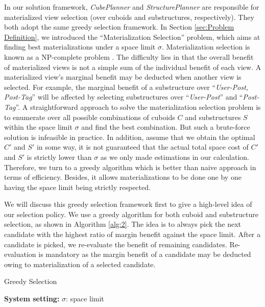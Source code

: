 	In our solution framework, \emph{CubePlanner} and \emph{StructurePlanner} are responsible for materialized view selection (over cuboids and substructures, respectively). They both adopt the same greedy selection framework. In Section \ref{sec:Problem Definition}, we introduced the ``Materialization Selection'' problem, which aims at finding best materializations under a space limit $\sigma$. Materialization selection is known as a NP-complete problem \cite{DBLP:journals/kais/LinK04}. The difficulty lies in that the overall benefit of materialized views is not a simple sum of the individual benefit of each view. A materialized view's marginal benefit may be deducted when another view is selected. For example, the marginal benefit of a substructure over ``\textit{User-Post, Post-Tag}'' will be affected by selecting substructures over ``\textit{User-Post}'' and ``\textit{Post-Tag}''. A straightforward approach to solve the materialization selection problem is to enumerate over all possible combinations of cuboids $C$ and substructures $S$ within the space limit $\sigma$ and find the best combination. But such a brute-force solution is infeasible in practice. In addition, assume that we obtain the optimal $C'$ and $S'$ in some way, it is not guaranteed that the actual total space cost of $C'$ and $S'$ is strictly lower than $\sigma$ as we only made estimations in our calculation. Therefore, we turn to a greedy algorithm which is better than naive approach in terms of efficiency. Besides, it allows materializations to be done one by one having the space limit being strictly respected.
	
	We will discuss this greedy selection framework first to give a high-level idea of our selection policy. We use a greedy algorithm for both cuboid and substructure selection, as shown in Algorithm \ref{alg:2}. The idea is to always pick the next candidate with the highest ratio of margin benefit against the space limit. After a candidate is picked, we re-evaluate the benefit of remaining candidates. Re-evaluation is mandatory as the margin benefit of a candidate may be deducted owing to materialization of a selected candidate.
	
	
	\begin{algorithm}[H]
		\label{alg:2}
		\caption{Greedy Selection}
		\LinesNumbered
		\textbf{System setting:} $\sigma$: space limit\\
		
	\end{algorithm}
	
